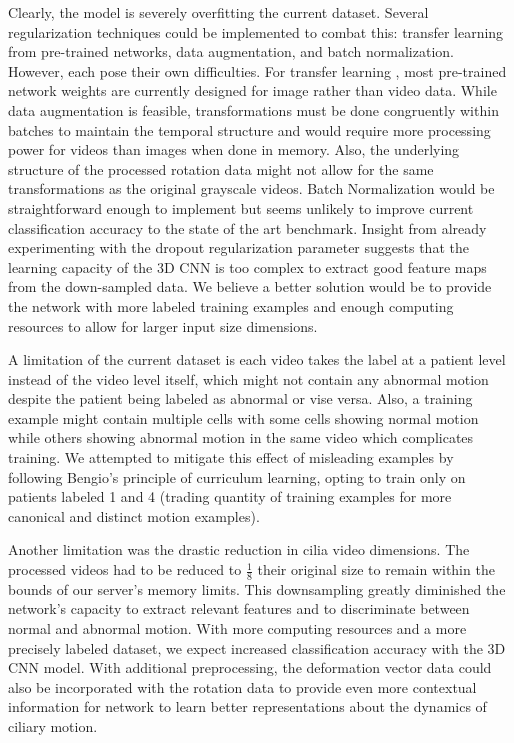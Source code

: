 Clearly, the model is severely overfitting the current dataset. Several regularization techniques could be implemented to combat this: transfer learning from pre-trained networks, data augmentation, and batch normalization. However, each pose their own difficulties. For transfer learning \cite{pan2010survey}, most pre-trained network weights are currently designed for image rather than video data. While data augmentation is feasible, transformations must be done congruently within batches to maintain the temporal structure and would require more processing power for videos than images when done in memory. Also, the underlying structure of the processed rotation data might not allow for the same transformations as the original grayscale videos. Batch Normalization \cite{ioffe2015batch} would be straightforward enough to implement but seems unlikely to improve current classification accuracy to the state of the art benchmark. Insight from already experimenting with the dropout regularization parameter suggests that the learning capacity of the 3D CNN is too complex to extract good feature maps from the down-sampled data. We believe a better solution would be to provide the network with more labeled training examples and enough computing resources to allow for larger input size dimensions. 
 
A limitation of the current dataset is each video takes the label at a patient level instead of the video level itself, which might not contain any abnormal motion despite the patient being labeled as abnormal or vise versa. Also, a training example might contain multiple cells with some cells showing normal motion while others showing abnormal motion in the same video which complicates training. We attempted to mitigate this effect of misleading examples by following Bengio's \cite{bengio2009curriculum} principle of curriculum learning, opting to train only on patients labeled 1 and 4 (trading quantity of training examples for more canonical and distinct motion examples).

Another limitation was the drastic reduction in cilia video dimensions. The processed videos had to be reduced to $\frac{1}{8}$ their original size to remain within the bounds of our server's memory limits. This downsampling greatly diminished the network's capacity to extract relevant features and to discriminate between normal and abnormal motion. With more computing resources and a more precisely labeled dataset, we expect increased classification accuracy with the 3D CNN model. With additional preprocessing, the deformation vector data could also be incorporated with the rotation data to provide even more contextual information for network to learn better representations about the dynamics of ciliary motion.

